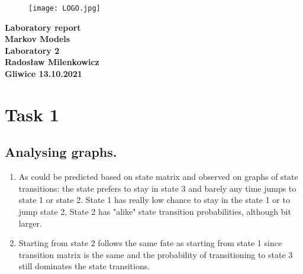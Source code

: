 \documentclass[a4paper]{article}
\begin{document}

\begin{titlepage}
    \centering
	\begin{figure}[H]
	\centering
	\texttt{[image: LOGO.jpg]}
	\end{figure}
    \vspace*{0.5cm}
    \huge\bfseries
    Laboratory report \\Markov Models \\Laboratory 2 \\
    \vspace*{0.1cm}
    \vspace*{0.5cm}
    \vspace*{0.5cm}
    \vspace*{1cm}
    \large Radosław Milenkowicz\\

    \vspace*{\fill}
    \large Gliwice 13.10.2021 \\
\end{titlepage}
\newpage


\section{Task 1}
\subsection{Analysing graphs.}
\begin{enumerate}
    \item As could be predicted based on state matrix and observed on graphs of state transitions: the  state prefers to stay in state 3 and barely any time jumps to state 1 or state 2. State 1 has really low chance to stay in the state 1 or to jump state 2, State 2 has "alike" state transition probabilities, although bit larger.
    \item Starting from state 2 follows the same fate as starting from state 1 since transition matrix is the same and the probability of transitioning to state 3 still dominates the state transitions.
\end{enumerate}
\end{document}
